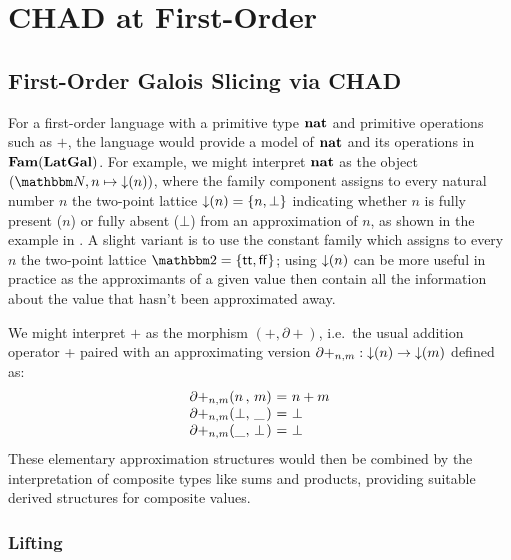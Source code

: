 \section{CHAD at First-Order}
\label{sec:first-order}


\subsection{First-Order Galois Slicing via CHAD}
\label{sec:fam:galois-slicing}

For a first-order language with a primitive type $\mathbf{nat}$ and primitive operations such as $+$, the
language would provide a model of $\mathbf{nat}$ and its operations in $\mathbf{Fam}(\mathbf{LatGal})$. For example, we might
interpret $\mathbf{nat}$ as the object $(\Nat,n \mapsto \downset{n})$, where the family component assigns to
every natural number $n$ the two-point lattice $\mathop{\downarrow}(n) = \{n, \bot\}$ indicating whether $n$ is fully
present ($n$) or fully absent ($\bot$) from an approximation of $n$, as shown in the example in
. A slight variant is to use the constant family which assigns to every $n$ the two-point
lattice $\Two = \{\mathsf{tt},\mathsf{ff}\}$; using $\mathop{\downarrow}(n)$ can be more useful in practice as the
approximants of a given value then contain all the information about the value that hasn't been approximated
away.

We might interpret $+$ as the morphism $(+,\partial+)$, i.e.~the usual addition operator + paired with an
approximating version $\partial+_{n,m}: \mathop{\downarrow}(n) \to \mathop{\downarrow}(m)$ defined as:
\begin{displaymath}
    \begin{array}[t]{l@{(}l@{,~}l@{)~}c@{~}l}
      \partial+_{n,m}&n&m&=&n + m \\
      \partial+_{n,m}&\bot&\_&=&\bot \\
      \partial+_{n,m}&\_&\bot&=&\bot
    \end{array}
\end{displaymath}
These elementary approximation structures would then be combined by the interpretation of composite types like
sums and products, providing suitable derived structures for composite values.

\subsubsection{Lifting}
\label{sec:first-order:lifting}

